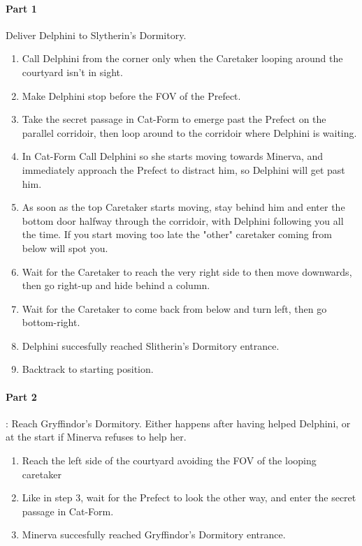 \paragraph{Part 1} Deliver Delphini to Slytherin's Dormitory.


\begin{enumerate}
\item Call Delphini from the corner only when the Caretaker looping around the courtyard isn't in sight.
	\item Make Delphini stop before the FOV of the Prefect.
	\item Take the secret passage in Cat-Form to emerge past the Prefect on the parallel corridoir, then loop around to the corridoir where Delphini is waiting.
	\item In Cat-Form Call Delphini so she starts moving towards Minerva, and immediately approach the Prefect to distract him, so Delphini will get past him.
	\item As soon as the top Caretaker starts moving, stay behind him and enter the bottom door halfway through the corridoir, with Delphini following you all the time. If you start moving too late the "other" caretaker coming from below will spot you.
	\item Wait for the Caretaker to reach the very right side to then move downwards, then go right-up and hide behind a column.
	\item Wait for the Caretaker to come back from below and turn left, then go bottom-right.
	\item Delphini succesfully reached Slitherin's Dormitory entrance.
	\item Backtrack to starting position.
\end{enumerate}

\paragraph{Part 2}: Reach Gryffindor's Dormitory. Either happens after having helped Delphini, or at the start if Minerva refuses to help her.

\begin{enumerate}[label={\arabic*.}, resume]
	\item Reach the left side of the courtyard avoiding the FOV of the looping caretaker
	\item Like in step 3, wait for the Prefect to look the other way, and enter the secret passage in Cat-Form.
	\item Minerva succesfully reached Gryffindor's Dormitory entrance.
\end{enumerate}

